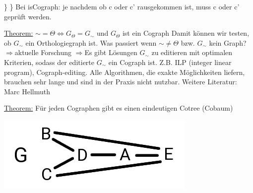 \newline
\phantom{}\hspace{1.5cm} \}
\newline
\}
\newline
Bei isCograph: je nachdem ob c oder c' rausgekommen ist, muss c oder c' geprüft werden.
\par\medskip
\underline{Theorem:}
\newline
$\sim = \Theta \Leftrightarrow G_\Theta = G_\sim$ und $G_\Theta$ ist ein Cograph
\newline
Damit können wir testen, ob $G_\sim$ ein Orthologiegraph ist.
\newline
Was passiert wenn $\sim \neq \Theta$ bzw. $G_\sim$ kein Graph?
\newline
$\Rightarrow$aktuelle Forschung $\Rightarrow$Es gibt Lösungen $G_\sim$ zu editieren mit optimalen Kriterien, sodass der editierte $G_\sim$ ein Cograph ist. Z.B. ILP (integer linear program), Cograph-editing. Alle Algorithmen, die exakte Möglichkeiten liefern, brauchen sehr lange und sind in der Praxis nicht nutzbar.
\newline
Weitere Literatur: Marc Hellmuth
\par\medskip
\underline{Theorem:}
\newline
Für jeden Cographen gibt es einen eindeutigen Cotree (Cobaum)
\newline
\begin{center}
	\includegraphics[scale=0.5]{lectures/161202/pix/08.jpg}
\end{center}
\renewcommand{\labelenumi}{\arabic{enumi}.}
